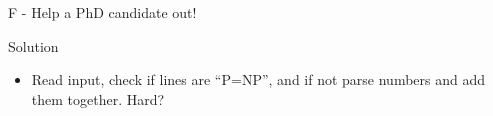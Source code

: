 \renewcommand{\insertshortauthor}{Problem Author: Christian Jonassen}
\begin{frame}{F - Help a PhD candidate out!}

\begin{block}{Solution}
  \begin{itemize}
    \item Read input, check if lines are ``P=NP'', and if not parse numbers and add them together. Hard?
  \end{itemize}
\end{block}

\end{frame}
